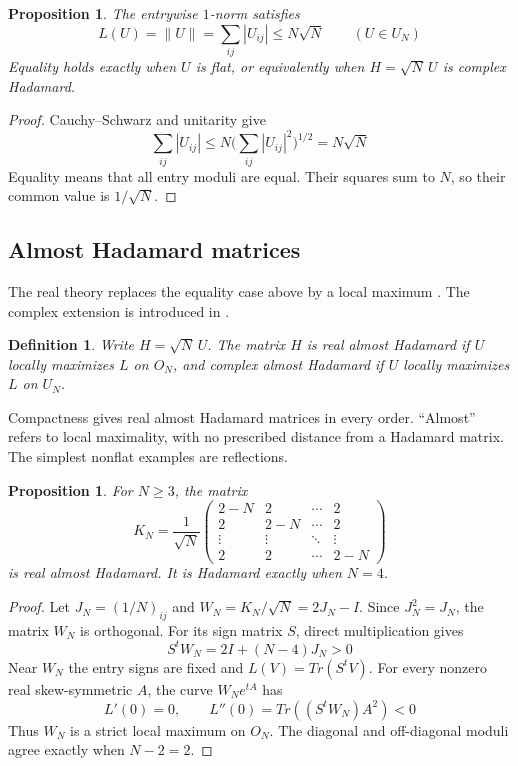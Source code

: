 \documentclass[11pt,a4paper]{article}
\newtheorem{prop}[thm]{Proposition}
\newtheorem{defn}[thm]{Definition}
\begin{document}
\begin{prop}\label{globalbound}
The entrywise $1$-norm satisfies
\[
 L(U)=\|U\|=\sum_{ij}|U_{ij}|\le N\sqrt N\qquad(U\in U_N)
\]
Equality holds exactly when $U$ is flat, or equivalently when
$H=\sqrt N\,U$ is complex Hadamard.
\end{prop}
\begin{proof}
Cauchy--Schwarz and unitarity give
\[
 \sum_{ij}|U_{ij}|\le N\Big(\sum_{ij}|U_{ij}|^2\Big)^{1/2}=N\sqrt N
\]
Equality means that all entry moduli are equal. Their squares sum to
$N$, so their common value is $1/\sqrt{N}$.
\end{proof}

\subsection{Almost Hadamard matrices}
The real theory replaces the equality case above by a local maximum
\cite{BCS,BNZ}. The complex extension is introduced in \cite{BN}.

\begin{defn}
Write $H=\sqrt N\,U$. The matrix $H$ is real almost Hadamard if $U$
locally maximizes $L$ on $O_N$, and complex almost Hadamard if $U$
locally maximizes $L$ on $U_N$.
\end{defn}

Compactness gives real almost Hadamard matrices in every order.
``Almost'' refers to local maximality, with no prescribed distance
from a Hadamard matrix. The simplest nonflat examples are reflections.

\begin{prop}\label{realreflection}
For $N\ge3$, the matrix
\[
 K_N=\frac1{\sqrt N}
 \begin{pmatrix}
 2-N&2&\cdots&2\\
 2&2-N&\cdots&2\\
 \vdots&\vdots&\ddots&\vdots\\
 2&2&\cdots&2-N
 \end{pmatrix}
\]
is real almost Hadamard. It is Hadamard exactly when $N=4$.
\end{prop}
\begin{proof}
Let $J_N=(1/N)_{ij}$ and $W_N=K_N/\sqrt N=2J_N-I$.
Since $J_N^2=J_N$, the matrix $W_N$ is orthogonal. For its sign matrix
$S$, direct multiplication gives
\[
 S^tW_N=2I+(N-4)J_N>0
\]
Near $W_N$ the entry signs are fixed and $L(V)=Tr(S^tV)$.
For every nonzero real skew-symmetric $A$, the curve $W_Ne^{tA}$ has
\[
 L'(0)=0,\qquad L''(0)=Tr((S^tW_N)A^2)<0
\]
Thus $W_N$ is a strict local maximum on $O_N$. The diagonal and
off-diagonal moduli agree exactly when $N-2=2$.
\end{proof}
\end{document}
